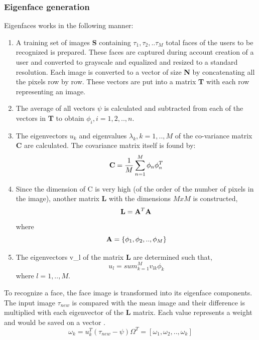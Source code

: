 \documentclass[%
        final,
        notitlepage,
        narroweqnarray,
        inline,
        ]{ieee}
\begin{document}
\subsubsection{ Eigenface generation }
Eigenfaces works in the following manner:
\begin{enumerate}
	\item A training set of images {\bf S} containing $\tau_{1},\tau_{2},..\tau_{M}$ total faces of the users to be recognized is prepared. These faces are captured during account creation of a user and converted to grayscale and equalized and resized to a standard resolution. Each image is converted to a vector of size {\bf N} by concatenating all the pixels row by row. These vectors are put into a matrix {\bf T} with each row representing an image.
	\item The average of all vectors $\psi$ is calculated and subtracted from each of the vectors in {\bf T} to obtain $\phi_{i}, i = 1,2,..,n$.
	\item The eigenvectors $u_{k}$ and eigenvalues $\lambda_{k}, k = 1,..,M$ of the co-variance matrix {\bf C} are calculated. The covariance matrix itself is found by: 
\begin{equation}
{\bf C} = \frac{1}{M}\sum_{n=1}^{M}\phi_{n}\phi_{n}^{T}
\end{equation}
	\item Since the dimension of C is very high (of the order of the number of pixels in the image), another matrix {\bf L} with the dimensions $MxM$ is constructed, 
\begin{equation}
{\bf L} = {\bf A}^{T}{\bf A}
\end{equation}
where 
\begin{equation}
{\bf A} = \{\phi_{1},\phi_{2},..,\phi_{M}\}
\end{equation}
	\item The eigenvectors v_{l} of the matrix {\bf L} are determined such that,
\begin{equation}
u_{l} = sum_{k=1}^{M}v_{lk}\phi_{k} 
\end{equation}
where $l = 1,..,M$.
\end{enumerate}

To recognize a face, the face image is transformed into its eigenface components. The input image $\tau_{new}$ is compared with the mean image and their difference is multiplied with each eigenvector of the {\bf L} matrix. Each value represents a weight and would be saved on a vector \Omega.
\begin{equation}
\omega_{k} = u_{k}^{T}(\tau_{new} - \psi)	\Omega^{T} = [\omega_{1},\omega_{2},..,\omega_{k}] 
\end{equation}
\end{document}
